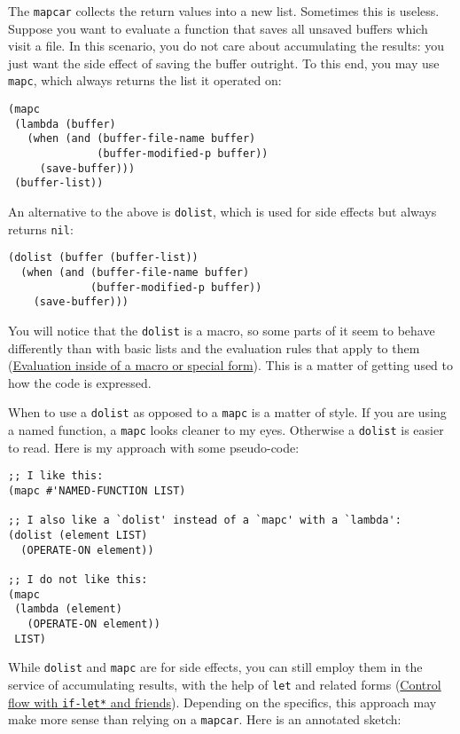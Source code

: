 \documentclass[11pt]{ctexart}
\begin{document}
The \texttt{mapcar} collects the return values into a new list. Sometimes this is useless. Suppose you want to evaluate a function that saves all unsaved buffers which visit a file. In this scenario, you do not care about accumulating the results: you just want the side effect of saving the buffer outright. To this end, you may use \texttt{mapc}, which always returns the list it operated on:

\begin{verbatim}
(mapc
 (lambda (buffer)
   (when (and (buffer-file-name buffer)
              (buffer-modified-p buffer))
     (save-buffer)))
 (buffer-list))
\end{verbatim}

An alternative to the above is \texttt{dolist}, which is used for side effects but always returns \texttt{nil}:

\begin{verbatim}
(dolist (buffer (buffer-list))
  (when (and (buffer-file-name buffer)
             (buffer-modified-p buffer))
    (save-buffer)))
\end{verbatim}

You will notice that the \texttt{dolist} is a macro, so some parts of it seem to behave differently than with basic lists and the evaluation rules that apply to them (\hyperref[sec:org61e1a1b]{Evaluation inside of a macro or special form}). This is a matter of getting used to how the code is expressed.

When to use a \texttt{dolist} as opposed to a \texttt{mapc} is a matter of style. If you are using a named function, a \texttt{mapc} looks cleaner to my eyes. Otherwise a \texttt{dolist} is easier to read. Here is my approach with some pseudo-code:

\begin{verbatim}
;; I like this:
(mapc #'NAMED-FUNCTION LIST)

;; I also like a `dolist' instead of a `mapc' with a `lambda':
(dolist (element LIST)
  (OPERATE-ON element))

;; I do not like this:
(mapc
 (lambda (element)
   (OPERATE-ON element))
 LIST)
\end{verbatim}

While \texttt{dolist} and \texttt{mapc} are for side effects, you can still employ them in the service of accumulating results, with the help of \texttt{let} and related forms (\hyperref[sec:org8aa5d4d]{Control flow with \texttt{if-let*} and friends}). Depending on the specifics, this approach may make more sense than relying on a \texttt{mapcar}. Here is an annotated sketch:
\end{document}
